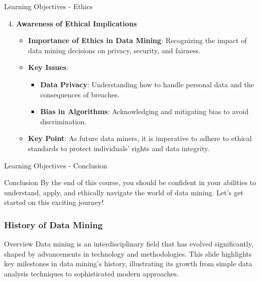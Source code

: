 \documentclass[aspectratio=169]{beamer}
\begin{document}
\begin{frame}[fragile]{Learning Objectives - Ethics}
    \begin{enumerate}
        \setcounter{enumi}{3}
        \item \textbf{Awareness of Ethical Implications}
        \begin{itemize}
            \item \textbf{Importance of Ethics in Data Mining}: Recognizing the impact of data mining decisions on privacy, security, and fairness.
            \item \textbf{Key Issues}:
            \begin{itemize}
                \item \textbf{Data Privacy}: Understanding how to handle personal data and the consequences of breaches.
                \item \textbf{Bias in Algorithms}: Acknowledging and mitigating bias to avoid discrimination.
            \end{itemize}
            \item \textbf{Key Point}: As future data miners, it is imperative to adhere to ethical standards to protect individuals' rights and data integrity.
        \end{itemize}
    \end{enumerate}
\end{frame}

\begin{frame}[fragile]{Learning Objectives - Conclusion}
    \begin{block}{Conclusion}
        By the end of this course, you should be confident in your abilities to understand, apply, and ethically navigate the world of data mining. Let's get started on this exciting journey!
    \end{block}
\end{frame}

\begin{frame}[fragile]
    \frametitle{History of Data Mining}
    \begin{block}{Overview}
        Data mining is an interdisciplinary field that has evolved significantly, shaped by advancements in technology and methodologies. This slide highlights key milestones in data mining's history, illustrating its growth from simple data analysis techniques to sophisticated modern approaches.
    \end{block}
\end{frame}
\end{document}
